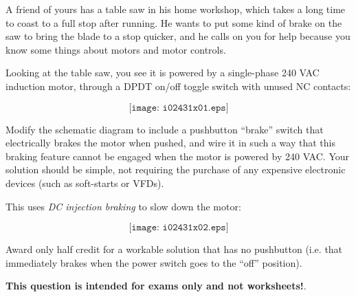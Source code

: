 

A friend of yours has a table saw in his home workshop, which takes a long time to coast to a full stop after running.  He wants to put some kind of brake on the saw to bring the blade to a stop quicker, and he calls on you for help because you know some things about motors and motor controls.

Looking at the table saw, you see it is powered by a single-phase 240 VAC induction motor, through a DPDT on/off toggle switch with unused NC contacts:

$$\texttt{[image: i02431x01.eps]}$$

\vskip 100pt

Modify the schematic diagram to include a pushbutton ``brake'' switch that electrically brakes the motor when pushed, and wire it in such a way that this braking feature cannot be engaged when the motor is powered by 240 VAC.  Your solution should be simple, not requiring the purchase of any expensive electronic devices (such as soft-starts or VFDs).







This uses {\it DC injection braking} to slow down the motor:

$$\texttt{[image: i02431x02.eps]}$$

Award only half credit for a workable solution that has no pushbutton (i.e. that immediately brakes when the power switch goes to the ``off'' position).







{\bf This question is intended for exams only and not worksheets!}.


